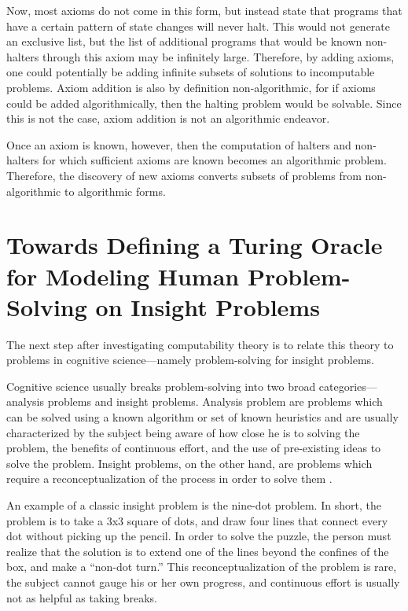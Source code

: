 Now, most axioms do not come in this form, but instead state that programs that have a certain pattern of state changes will never halt.  This would not generate an exclusive list, but the list of additional programs that would be known non-halters through this axiom may be infinitely large.  Therefore, by adding axioms, one could potentially be adding infinite subsets of solutions to incomputable problems.  Axiom addition is also by definition non-algorithmic, for if axioms could be added algorithmically, then the halting problem would be solvable.  Since this is not the case, axiom addition is not an algorithmic endeavor.

Once an axiom is known, however, then the computation of halters and non-halters for which sufficient axioms are known becomes an algorithmic problem.  Therefore, the discovery of new axioms converts subsets of problems from non-algorithmic to algorithmic forms.

\section[Towards Defining a Turing Oracle]{Towards Defining a Turing Oracle for Modeling Human Problem-Solving on Insight Problems}

The next step after investigating computability theory is to relate this theory to problems in cognitive science---namely problem-solving for insight problems.

Cognitive science usually breaks problem-solving into two broad categories---analysis problems and insight problems.  Analysis problem are problems which can be solved using a known algorithm or set of known heuristics and are usually characterized by the subject being aware of how close he is to solving the problem, the benefits of continuous effort, and the use of pre-existing ideas to solve the problem.  Insight problems, on the other hand, are problems which require a reconceptualization of the process in order to solve them \citep{chronicleetal2004}. 

An example of a classic insight problem is the nine-dot problem.  In short, the problem is to take a 3x3 square of dots, and draw four lines that connect every dot without picking up the pencil.  In order to solve the puzzle, the person must realize that the solution is to extend one of the lines beyond the confines of the box, and make a ``non-dot turn.''  This reconceptualization of the problem is rare, the subject cannot gauge his or her own progress, and continuous effort is usually not as helpful as taking breaks.

